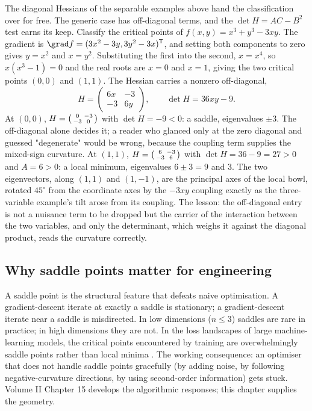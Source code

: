 The diagonal Hessians of the separable examples above hand the
classification over for free. The generic case has off-diagonal terms,
and the $\det H = AC - B^{2}$ test earns its keep. Classify the
critical points of $f(x, y) = x^{3} + y^{3} - 3 x y$. The gradient is
$\grad f = (3 x^{2} - 3 y, 3 y^{2} - 3 x)^{\mathsf{T}}$, and setting
both components to zero gives $y = x^{2}$ and $x = y^{2}$. Substituting
the first into the second, $x = x^{4}$, so $x(x^{3} - 1) = 0$ and the
real roots are $x = 0$ and $x = 1$, giving the two critical points
$(0, 0)$ and $(1, 1)$. The Hessian carries a nonzero off-diagonal,
\[
H = \begin{pmatrix} 6 x & -3 \\ -3 & 6 y \end{pmatrix},
\qquad \det H = 36 x y - 9.
\]
At $(0, 0)$, $H = \begin{psmallmatrix} 0 & -3 \\ -3 & 0
\end{psmallmatrix}$ with $\det H = -9 < 0$: a saddle, eigenvalues
$\pm 3$. The off-diagonal alone decides it; a reader who glanced only
at the zero diagonal and guessed "degenerate" would be wrong, because
the coupling term supplies the mixed-sign curvature. At $(1, 1)$,
$H = \begin{psmallmatrix} 6 & -3 \\ -3 & 6 \end{psmallmatrix}$ with
$\det H = 36 - 9 = 27 > 0$ and $A = 6 > 0$: a local minimum,
eigenvalues $6 \pm 3 = 9$ and $3$. The two eigenvectors, along $(1, 1)$
and $(1, -1)$, are the principal axes of the local bowl, rotated
$45^{\circ}$ from the coordinate axes by the $-3xy$ coupling exactly as
the three-variable example's tilt arose from its coupling. The lesson:
the off-diagonal entry is not a nuisance term to be dropped but the
carrier of the interaction between the two variables, and only the
determinant, which weighs it against the diagonal product, reads the
curvature correctly.

\subsection{Why saddle points matter for engineering}

A saddle point is the structural feature that defeats naive
optimisation. A gradient-descent iterate at exactly a saddle is
stationary; a gradient-descent iterate near a saddle is misdirected.
In low dimensions ($n \leq 3$) saddles are rare in practice; in
high dimensions they are not. In the loss landscapes of large
machine-learning models, the critical points encountered by training
are overwhelmingly saddle points rather than local minima
\cite{paper:v2ch11-dauphin-saddle-2014}. The working consequence:
an optimiser that does not handle saddle points gracefully (by
adding noise, by following negative-curvature directions, by using
second-order information) gets stuck. Volume II Chapter 15 develops
the algorithmic responses; this chapter supplies the geometry.

